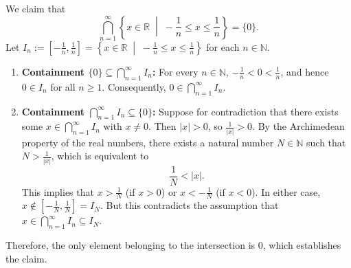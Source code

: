 \begin{exercisesolution*}
\label{sol:archimedean_intersection}
We claim that
\[
\bigcap_{n=1}^\infty \left\{ x \in \mathbb{R} \;\middle|\; -\frac{1}{n} \le x \le \frac{1}{n} \right\} = \{0\}.
\]
Let $I_n := \left[-\frac{1}{n}, \frac{1}{n}\right] = \left\{ x \in \mathbb{R} \;\middle|\; -\frac{1}{n} \le x \le \frac{1}{n} \right\}$ for each $n \in \mathbb{N}$.
\begin{enumerate}
    \item \textbf{Containment $\{0\} \subseteq \bigcap_{n=1}^\infty I_n$:} For every $n \in \mathbb{N}$, $-\frac{1}{n} < 0 < \frac{1}{n}$, and hence $0 \in I_n$ for all $n \ge 1$. Consequently, $0 \in \bigcap_{n=1}^\infty I_n$.

    \item \textbf{Containment $\bigcap_{n=1}^\infty I_n \subseteq \{0\}$:} Suppose for contradiction that there exists some $x \in \bigcap_{n=1}^\infty I_n$ with $x \ne 0$. Then $|x| > 0$, so $\frac{1}{|x|} > 0$. By the Archimedean property of the real numbers, there exists a natural number $N \in \mathbb{N}$ such that $N > \frac{1}{|x|}$, which is equivalent to
    \[
    \frac{1}{N} < |x|.
    \]
    This implies that $x > \frac{1}{N}$ (if $x > 0$) or $x < -\frac{1}{N}$ (if $x < 0$). In either case, $x \notin \left[-\frac{1}{N}, \frac{1}{N}\right] = I_N$. But this contradicts the assumption that $x \in \bigcap_{n=1}^\infty I_n \subseteq I_N$.
\end{enumerate}
Therefore, the only element belonging to the intersection is $0$, which establishes the claim.
\end{exercisesolution*}

